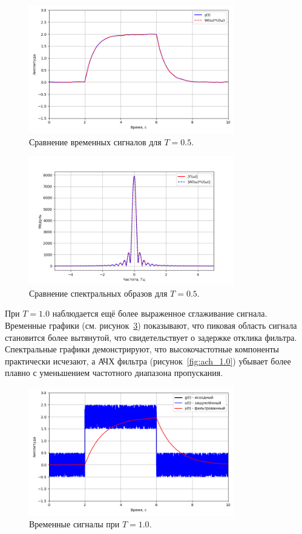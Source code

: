 \documentclass[a4paper]{article}
\begin{document}
\begin{figure}[H]
  \centering
  \includegraphics[width=0.8\textwidth]{src/task_1_1/time_comp_2.0_0.5.png}
  \caption{Сравнение временных сигналов для \(T=0.5\).}
  \label{fig:timecomp_0.5}
\end{figure}

\begin{figure}[H]
  \centering
  \includegraphics[width=0.8\textwidth]{src/task_1_1/spec_comp_2.0_0.5.png}
  \caption{Сравнение спектральных образов для \(T=0.5\).}
  \label{fig:speccomp_0.5}
\end{figure}

При \(T=1.0\) наблюдается ещё более выраженное сглаживание сигнала. Временные графики (см. рисунок~\ref{fig:time_1.0}) показывают, что пиковая область сигнала становится более вытянутой, что свидетельствует о задержке отклика фильтра. Спектральные графики демонстрируют, что высокочастотные компоненты практически исчезают, а АЧХ фильтра (рисунок~\ref{fig:ach_1.0}) убывает более плавно с уменьшением частотного диапазона пропускания.

\begin{figure}[H]
  \centering
  \includegraphics[width=0.8\textwidth]{src/task_1_1/time_2.0_1.0.png}
  \caption{Временные сигналы при \(T=1.0\).}
  \label{fig:time_1.0}
\end{figure}
\end{document}
